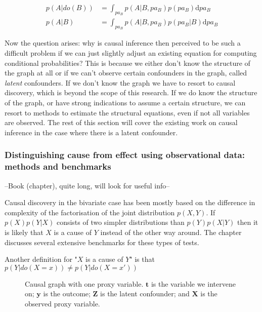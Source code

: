 \documentclass{article}
\newcommand{\bt}{\mathbf{t}}
\newcommand{\bX}{\mathbf{X}}
\newcommand{\by}{\mathbf{y}}
\newcommand{\bZ}{\mathbf{Z}}
\begin{document}
\begin{align}\label{equation:do_operation}
    p(A | do(B)) &= \int_{pa_B} p(A | B, pa_{B}) p(pa_{B}) \text{d} pa_B\\
    p(A | B) &= \int_{pa_B} p(A | B, pa_{B}) p(pa_{B}|B) \text{d} pa_B
\end{align}

Now the question arises: why is causal inference then perceived to be such a difficult problem if we can just slightly adjust an existing equation for computing conditional probabilities? This is because we either don't know the structure of the graph at all or if we can't observe certain confounders in the graph, called \textit{latent} confounders. If we don't know the graph we have to resort to causal discovery, which is beyond the scope of this research. If we do know the structure of the graph, or have strong indications to assume a certain structure, we can resort to methods to estimate the structural equations, even if not all variables are observed. The rest of this section will cover the existing work on causal inference in the case where there is a latent confounder.







\subsubsection*{Distinguishing cause from effect using observational data: methods and benchmarks}
--Book (chapter)\cite{mooij2016distinguishing}, quite long, will look for useful info--

Causal discovery in the bivariate case has been mostly based on the difference in complexity of the factorisation of the joint distribution $p(X,Y)$. If $p(X)p(Y|X)$ consists of two simpler distributions than $p(Y)p(X|Y)$ then it is likely that $X$ is a cause of $Y$ instead of the other way around. The chapter discusses several extensive benchmarks for these types of tests.

Another definition for "$X$ is a cause of $Y$" is that $p(Y|do(X=x)) \neq p(Y|do(X=x'))$




\begin{figure}
    \centering
    
    \caption{Causal graph with one proxy variable. $\bt$ is the variable we intervene on; $\by$ is the outcome; $\bZ$ is the latent confounder; and $\bX$ is the observed proxy variable.}
    \label{fig:causal_graph}
\end{figure}
\end{document}
